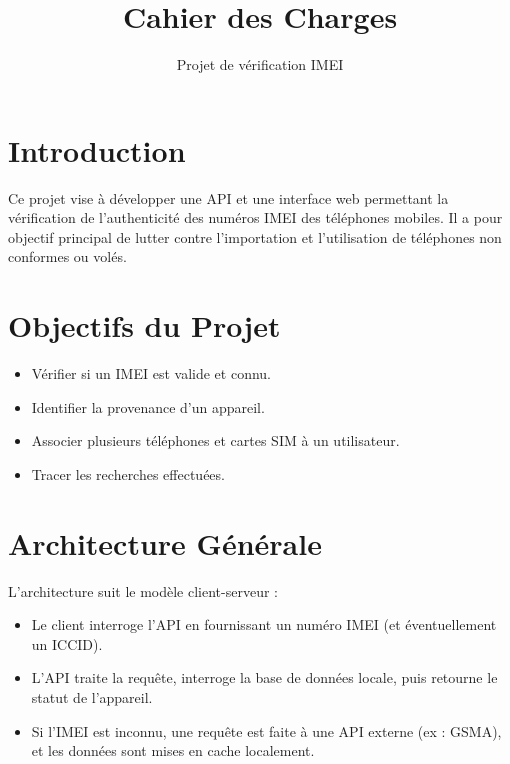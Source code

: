 \documentclass[a4paper,12pt]{article}
\title{Cahier des Charges}
\author{Projet de vérification IMEI}
\date{}
\begin{document}
\maketitle

\tableofcontents
\newpage

\section{Introduction}
Ce projet vise à développer une API et une interface web permettant la vérification de l'authenticité des numéros IMEI des téléphones mobiles. Il a pour objectif principal de lutter contre l'importation et l'utilisation de téléphones non conformes ou volés.

\section{Objectifs du Projet}
\begin{itemize}
    \item Vérifier si un IMEI est valide et connu.
    \item Identifier la provenance d'un appareil.
    \item Associer plusieurs téléphones et cartes SIM à un utilisateur.
    \item Tracer les recherches effectuées.
\end{itemize}

\section{Architecture Générale}
L'architecture suit le modèle client-serveur :
\begin{itemize}
    \item Le client interroge l’API en fournissant un numéro IMEI (et éventuellement un ICCID).
    \item L’API traite la requête, interroge la base de données locale, puis retourne le statut de l'appareil.
    \item Si l’IMEI est inconnu, une requête est faite à une API externe (ex : GSMA), et les données sont mises en cache localement.
\end{itemize}
\end{document}
